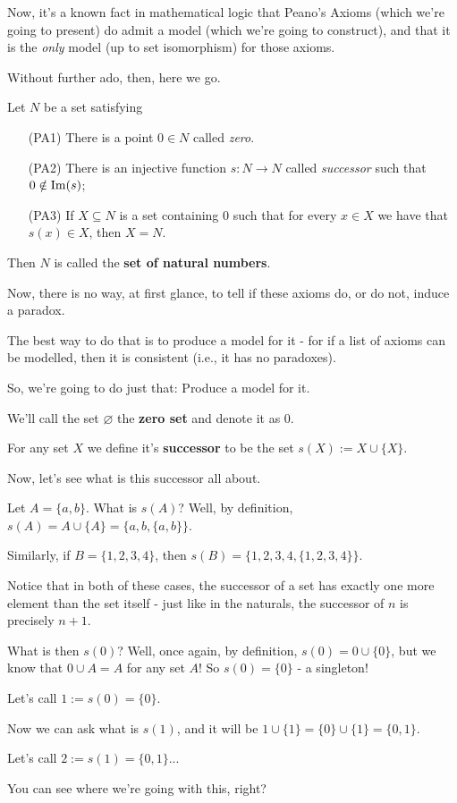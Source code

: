 Now, it's a known fact in mathematical logic that Peano's Axioms (which we're going to present) do admit a model (which we're going to construct), and that it is the \textit{only} model (up to set isomorphism) for those axioms.

Without further ado, then, here we go.

\begin{df}
	Let $N$ be a set satisfying
	\begin{enumerate}
		\item[(PA1)] There is a point $0\in N$ called \emph{zero}.
		\item[(PA2)] There is an injective function $s:N\to N$ called \emph{successor} such that $0\notin \operatorname{Im}(s)$;
		\item[(PA3)] If $X\subseteq N$ is a set containing $0$ such that for every $x\in X$ we have that $s(x)\in X$, then $X=N$. 
	\end{enumerate}

Then $N$ is called the \textbf{set of natural numbers}.
\end{df}

Now, there is no way, at first glance, to tell if these axioms do, or do not, induce a paradox.

The best way to do that is to produce a model for it - for if a list of axioms can be modelled, then it is consistent (i.e., it has no paradoxes).

So, we're going to do just that: Produce a model for it.

\begin{df}[Zero]
	We'll call the set $\varnothing$ the \textbf{zero set} and denote it as $0$.
\end{df}

\begin{df}[Successor]
	For any set $X$ we define it's \textbf{successor} to be the set $s(X):=X\cup\{X\}$.
\end{df}

Now, let's see what is this successor all about.

\begin{ex}
	Let $A=\{a,b\}$. What is $s(A)$? Well, by definition, $s(A)=A\cup\{A\}=\{a,b,\{a,b\}\}$.
	
	Similarly, if $B=\{1,2,3,4\}$, then $s(B)=\{1,2,3,4,\{1,2,3,4\}\}$.
	
	Notice that in both of these cases, the successor of a set has exactly one more element than the set itself - just like in the naturals, the successor of $n$ is precisely $n+1$.
	
	\bigskip
	What is then $s(0)$? Well, once again, by definition, $s(0)=0\cup\{0\}$, but we know that $0\cup A=A$ for any set $A$! So $s(0)=\{0\}$ - a singleton!
	
	Let's call $1:=s(0)=\{0\}$.
	
	Now we can ask what is $s(1)$, and it will be $1\cup\{1\}=\{0\}\cup\{1\}=\{0,1\}$.
	
	Let's call $2:=s(1)=\{0,1\}$...
	
	You can see where we're going with this, right?
\end{ex}

